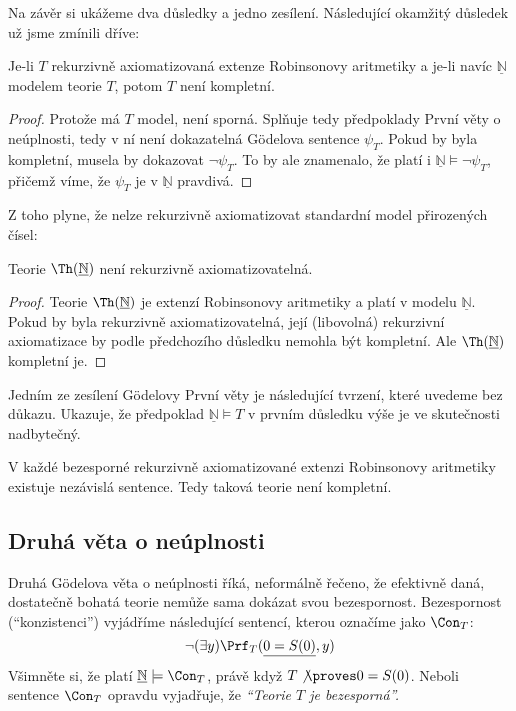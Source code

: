 Na závěr si ukážeme dva důsledky a jedno zesílení. Následující okamžitý důsledek už jsme zmínili dříve:

\begin{corollary}
Je-li $T$ rekurzivně axiomatizovaná extenze Robinsonovy aritmetiky a je-li navíc $\underline{\mathbb N}$ modelem teorie $T$, potom $T$ není kompletní.
\end{corollary}
\begin{proof}
Protože má $T$ model, není sporná. Splňuje tedy předpoklady První věty o neúplnosti, tedy v ní není dokazatelná Gödelova sentence $\psi_T$. Pokud by byla kompletní, musela by dokazovat $\neg\psi_T$. To by ale znamenalo, že platí i $\underline{\mathbb N}\models\neg\psi_T$, přičemž víme, že $\psi_T$ je v $\underline{\mathbb N}$ pravdivá.  
\end{proof}

Z toho plyne, že nelze rekurzivně axiomatizovat standardní model přirozených čísel:
\begin{corollary}
Teorie $\Th(\underline{\mathbb N})$ není rekurzivně axiomatizovatelná.    
\end{corollary}
\begin{proof}
Teorie $\Th(\underline{\mathbb N})$ je extenzí Robinsonovy aritmetiky a platí v modelu $\underline{\mathbb N}$. Pokud by byla rekurzivně axiomatizovatelná, její (libovolná) rekurzivní axiomatizace by podle předchozího důsledku nemohla být kompletní. Ale $\Th(\underline{\mathbb N})$ kompletní je.
\end{proof}

Jedním ze zesílení Gödelovy První věty je následující tvrzení, které uvedeme bez důkazu. Ukazuje, že předpoklad $\underline{\mathbb N}\models T$ v prvním důsledku výše je ve skutečnosti nadbytečný.

\begin{theorem}
V každé bezesporné rekurzivně axiomatizované extenzi Robinsonovy aritmetiky existuje nezávislá sentence. Tedy taková teorie není kompletní.    
\end{theorem}


\subsection{Druhá věta o neúplnosti}

Druhá Gödelova věta o neúplnosti říká, neformálně řečeno, že efektivně daná, dostatečně bohatá teorie nemůže sama dokázat svou bezespornost. Bezespornost (``konzistenci'') vyjádříme následující sentencí, kterou označíme jako $\Con_T$:
$$
\neg(\exists y)\Prf_T(\underline{0=S(0)},y)
$$
Všimněte si, že platí $\underline{\mathbb N}\models\Con_T$, právě když $T\not\proves 0=S(0)$. Neboli sentence $\Con_T$ opravdu vyjadřuje, že \emph{``Teorie $T$ je bezesporná''.}


